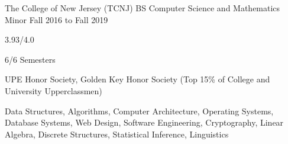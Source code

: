 
\begin{cventry}
    {The College of New Jersey (TCNJ)}
    {BS Computer Science and Mathematics Minor}
    {Fall 2016 to Fall 2019}{}{}
    \begin{cvitems}
        \item{} 3.93/4.0
        \item{} 6/6 Semesters
        \item{} UPE Honor Society, Golden Key Honor Society (Top 15\% of College and University Upperclassmen)
        \item{} Data Structures, Algorithms, Computer Architecture, Operating Systems, Database Systems, Web Design, Software Engineering, Cryptography, Linear Algebra, Discrete Structures, Statistical Inference, Linguistics
    \end{cvitems}
\end{cventry}
